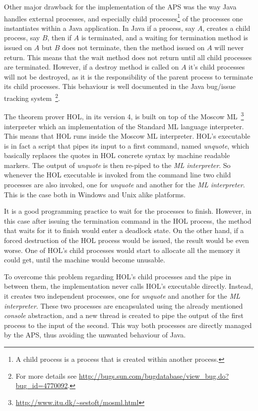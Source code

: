 \documentclass[]{article}
\begin{document}
Other major drawback for the implementation of the APS was the way Java handles external processes, and especially child processes\footnote{A child process is a process that is created within another process.} of the processes one instantiates within a Java application.
In Java if a process, say $A$, creates a child process, say $B$, then if $A$ is terminated, and a waiting for termination method is issued on $A$ but $B$ does not terminate, then the method issued on $A$ will never return.
This means that the wait method does not return until all child processes are terminated.
However, if a destroy method is called on $A$ it's child processes will not be destroyed, as it is the responsibility of the parent process to terminate its child processes.
This behaviour is well documented in the Java bug/issue tracking system~\footnote{For more details see \url{http://bugs.sun.com/bugdatabase/view_bug.do?bug_id=4770092}.}.

The theorem prover HOL, in its version 4, is built on top of the Moscow ML~\footnote{\url{http://www.itu.dk/~sestoft/mosml.html}} interpreter which an implementation of the Standard ML language interpreter.
This means that HOL runs inside the Moscow ML interpreter.
HOL's executable is in fact a script that pipes its input to a first command, named \emph{unquote}, which basically replaces the quotes in HOL concrete syntax by machine readable markers.
The output of \emph{unquote} is then re-piped to the \emph{ML interpreter}.
So whenever the HOL executable is invoked from the command line two child processes are also invoked, one for \emph{unquote} and another for the \emph{ML interpreter}.
This is the case both in Windows and Unix alike platforms.

It is a good programming practice to wait for the processes to finish.
However, in this case after issuing the termination command in the HOL process, the method that waits for it to finish would enter a deadlock state.
On the other hand, if a forced destruction of the HOL process would be issued, the result would be even worse.
One of HOL's child processes would start to allocate all the memory it could get, until the machine would become unusable.

To overcome this problem regarding HOL's child processes and the pipe in between them, the implementation never calls HOL's executable directly.
Instead, it creates two independent processes, one for \emph{unquote} and another for the \emph{ML interpreter}.
These two processes are encapsulated using the already mentioned \emph{console} abstraction, and a new thread is created to pipe the output of the first process to the input of the second.
This way both processes are directly managed by the APS, thus avoiding the unwanted behaviour of Java.
\end{document}

